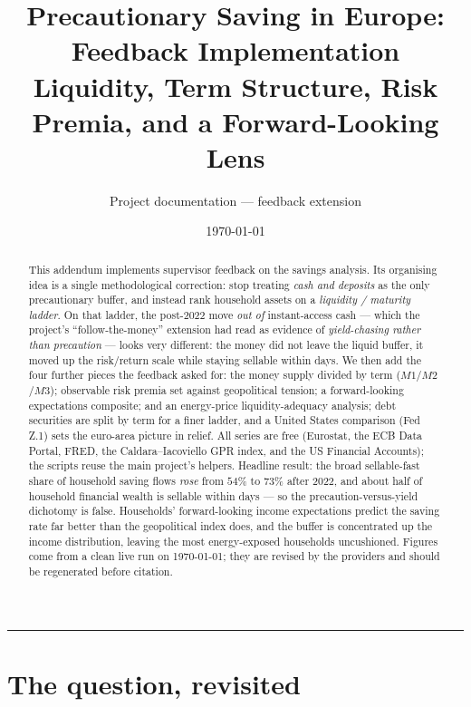 \documentclass[11pt,a4paper]{article}
\title{\textbf{Precautionary Saving in Europe: Feedback Implementation}\\[3pt]
       \large Liquidity, Term Structure, Risk Premia, and a Forward-Looking Lens}
\author{Project documentation --- feedback extension}
\date{\today}
\begin{document}
\maketitle
\thispagestyle{empty}

\begin{abstract}
\noindent
This addendum implements supervisor feedback on the savings analysis. Its
organising idea is a single methodological correction: stop treating
\emph{cash and deposits} as the only precautionary buffer, and instead rank
household assets on a \emph{liquidity / maturity ladder}. On that ladder, the
post-2022 move \emph{out of} instant-access cash --- which the project's
``follow-the-money'' extension had read as evidence of \emph{yield-chasing
rather than precaution} --- looks very different: the money did not leave the
liquid buffer, it moved up the risk/return scale while staying sellable within
days. We then add the four further pieces the feedback asked for: the money
supply divided by term ($M1$/$M2$/$M3$); observable risk premia set against
geopolitical tension; a forward-looking expectations composite; and an
energy-price liquidity-adequacy analysis; debt securities are split by term for a
finer ladder, and a United States comparison (Fed Z.1) sets the euro-area picture
in relief. All series are free (Eurostat, the ECB Data Portal, FRED, the
Caldara--Iacoviello GPR index, and the US Financial Accounts); the scripts reuse
the main project's helpers. Headline result: the broad
sellable-fast share of household saving flows \emph{rose} from $54\%$ to $73\%$
after 2022, and about half of household financial wealth is sellable within
days --- so the precaution-versus-yield dichotomy is false. Households'
forward-looking income expectations predict the saving rate far better than the
geopolitical index does, and the buffer is concentrated up the income
distribution, leaving the most energy-exposed households uncushioned. Figures
come from a clean live run on \today; they are revised by the providers and
should be regenerated before citation.
\end{abstract}

\tableofcontents
\bigskip
\hrule
\bigskip

\section{The question, revisited}\label{sec:question}
\end{document}
